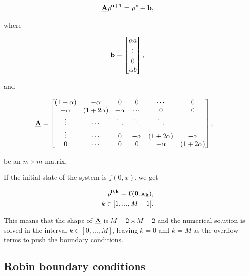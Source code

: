 \begin{align}
    \bf{\underline{A}} \bf{\rho^{n+1}}  = \bf{\rho^n} + \bf{b},
\end{align}

where

\begin{align}
    \bf{b} = \begin{bmatrix}
                    \alpha a \\
                    \vdots \\
                    0 \\
                    \alpha b 
                    \end{bmatrix},
\end{align}


and 

\begin{align}
\bf{\underline{A}} &= \begin{bmatrix}
           ( 1 + \alpha) & -\alpha  &  0 & 0 &  \cdots & 0\\
             -\alpha & ( 1 + 2 \alpha ) & -\alpha & \cdots & 0 & 0\\
           \vdots  &\cdots  & \ddots & \ddots &  \ddots&  \\
            \vdots & \cdots & 0  &  -\alpha & ( 1 + 2 \alpha ) & -\alpha \\
            0 & \cdots &0  & 0 & -\alpha & ( 1 + 2 \alpha )
         \end{bmatrix}
         \label{eq:discretization-matrix},
\end{align}

be an $m\times m$ matrix.

If the initial state of the system is $f(0,x)$, we get

\begin{align}
    \bf{\rho^{0,k}} = f(0, x_k), \\
    k \in [1,..., M-1].
\end{align}

This means that the shape of $\bf{\underline{A}}$ is $M-2 \times M-2$ and the numerical solution is solved in the interval  $k \in [0,..., M]$, leaving $k=0$ and $k=M$ as the overflow terms to push the boundary conditions.




\subsection{Robin boundary conditions}


